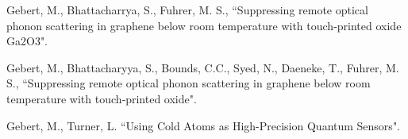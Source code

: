 \documentclass[10pt,a4paper,ragged2e,withhyper]{altacv}
\begin{document}
\begin{paracol}{2}
        \printbibliography[type=article,heading=none]
        
        \vspace{-1em}
        \divider
        
        
        \vspace{-0.6em}
        \printbibliography[type=unpublished,heading=none]
        
        
        
        
        
        
        
        
        
        
        Gebert, M., Bhattacharrya, S., Fuhrer, M. S., ``Suppressing remote optical phonon scattering in graphene below room temperature with touch-printed oxide Ga2O3".
        
        \divider
        
        Gebert, M., Bhattacharyya, S., Bounds, C.C., Syed, N., Daeneke, T., Fuhrer, M. S.,
        ``Suppressing remote optical phonon scattering in graphene below room temperature with touch‐printed oxide".
        
        \divider
        
        Gebert, M., Turner, L.
		``Using Cold Atoms as High-Precision Quantum Sensors".
		

\end{paracol}
\end{document}
